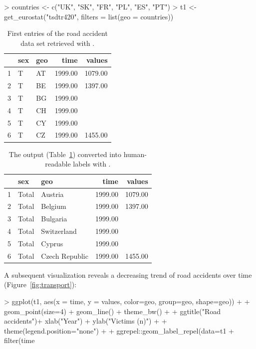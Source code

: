 \begin{example}
> countries <- c("UK", "SK", "FR", "PL", "ES", "PT")
> t1 <- get_eurostat("tsdtr420", filters = list(geo = countries)) 
\end{example}


\begin{table}[h!]
\centering
\begin{tabular}{rllrr}
\toprule
  \hline
  & sex & geo & time & values \\ 
  \hline
  1 & T & AT & 1999.00 & 1079.00 \\ 
  2 & T & BE & 1999.00 & 1397.00 \\ 
  3 & T & BG & 1999.00 &  \\ 
  4 & T & CH & 1999.00 &  \\ 
  5 & T & CY & 1999.00 &  \\ 
  6 & T & CZ & 1999.00 & 1455.00 \\ 
   \hline
\bottomrule      
\end{tabular}
\caption{First entries of the road accident data set retrieved with .}
\label{tab:getdatatable}
\end{table}



\begin{table}[h!]
\centering
\begin{tabular}{rllrr}
\toprule
  \hline
  & sex & geo & time & values \\ 
  \hline
  1 & Total & Austria & 1999.00 & 1079.00 \\ 
  2 & Total & Belgium & 1999.00 & 1397.00 \\ 
  3 & Total & Bulgaria & 1999.00 &  \\ 
  4 & Total & Switzerland & 1999.00 &  \\ 
  5 & Total & Cyprus & 1999.00 &  \\ 
  6 & Total & Czech Republic & 1999.00 & 1455.00 \\ 
   \hline
\bottomrule   
\end{tabular}
\caption{The  output (Table~\ref{tab:getdatatable}) converted into human-readable labels with .}
\label{tab:getdatatable2}
\end{table}

A subsequent visualization reveals a decreasing trend of road
accidents over time (Figure~\ref{fig:transport}):

\begin{example}
> ggplot(t1, aes(x = time, y = values, color=geo, group=geo, shape=geo)) +
+   geom_point(size=4) + geom_line() + theme_bw() +
+   ggtitle("Road accidents")+ xlab("Year") + ylab("Victims (n)") +
+   theme(legend.position="none") +
+   ggrepel::geom_label_repel(data=t1 %
+     filter(time %
\end{example}

